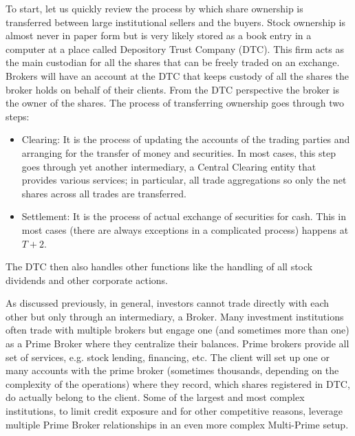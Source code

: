 To start, let us quickly review the process by which share ownership is transferred between large institutional sellers and the buyers. Stock ownership is almost never in paper form but is very likely stored as a book entry in a computer at a place called Depository Trust Company (DTC). This firm acts as the main custodian for all the shares that can be freely traded on an exchange. Brokers will have an account at the DTC that keeps custody of all the shares the broker holds on behalf of their clients. From the DTC perspective the broker is the owner of the shares. The process of transferring ownership goes through two steps:
        \begin{itemize}
        \item Clearing: It is the process of updating the accounts of the trading parties and arranging for the transfer of money and securities. In most cases, this step goes through yet another intermediary, a Central Clearing entity that provides various services; in particular, all trade aggregations so only the net shares across all trades are  transferred.
        \item Settlement: It is the process of actual exchange of securities for cash. This in most cases (there are always exceptions in a complicated process) happens at $T+2$.
        \end{itemize}
The DTC then also handles other functions like the handling of all stock dividends and other corporate actions.


As discussed previously, in general, investors cannot trade directly with each other but  only through an intermediary, a Broker. Many investment institutions often trade with multiple brokers but engage one (and sometimes more than one) as a Prime Broker where they centralize their balances. Prime brokers provide all set of services, e.g. stock lending, financing, etc. The client will set up one or many accounts with the prime broker (sometimes thousands, depending on the complexity of the operations) where they record, which shares registered in DTC, do actually belong to the client. Some of the largest and most complex institutions, to limit credit exposure and for other competitive reasons, leverage multiple Prime Broker relationships in an even more complex Multi-Prime setup. 


